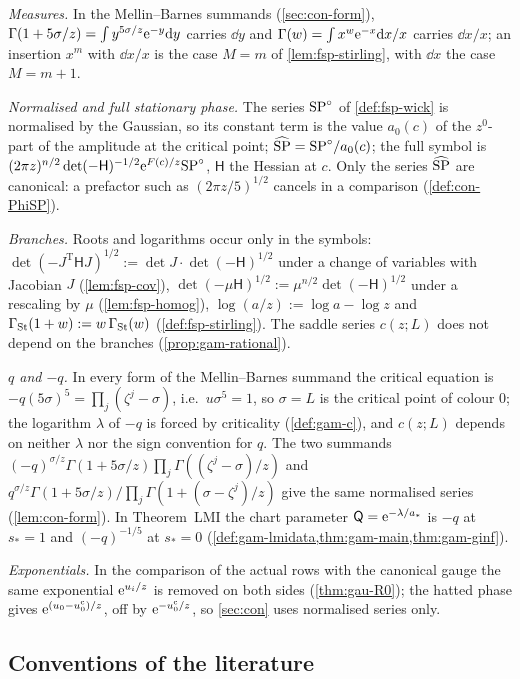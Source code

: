 \emph{Measures.} In the Mellin--Barnes summands (\cref{sec:con-form}), $\Gamma(1+5\sigma/z)=\int y^{5\sigma/z}\mathrm{e}^{-y}\mathrm{d} y$ carries $\dd y$ and $\Gamma(w)=\int x^w\mathrm{e}^{-x}\mathrm{d} x/x$ carries $\dd x/x$; an insertion $x^m$ with $\dd x/x$ is the case $M=m$ of \cref{lem:fsp-stirling}, with $\dd x$ the case $M=m+1$.

\emph{Normalised and full stationary phase.} The series $\mathrm{SP}^{\circ}$ of \cref{def:fsp-wick} is normalised by the Gaussian, so its constant term is the value $a_0(c)$ of the $z^0$-part of the amplitude at the critical point; $\widehat{\mathrm{SP}}=\mathrm{SP}^{\circ}/a_0(c)$; the full symbol is $(2\pi z)^{n/2}\det(-\mathsf H)^{-1/2}\mathrm{e}^{F(c)/z}\mathrm{SP}^{\circ}$, $\mathsf H$ the Hessian at $c$. Only the series $\widehat{\mathrm{SP}}$ are canonical: a prefactor such as $(2\pi z/5)^{1/2}$ cancels in a comparison (\cref{def:con-PhiSP}).

\emph{Branches.} Roots and logarithms occur only in the symbols: $\det(-J^{\mathrm T}\mathsf HJ)^{1/2}:=\det J\cdot\det(-\mathsf H)^{1/2}$ under a change of variables with Jacobian $J$ (\cref{lem:fsp-cov}), $\det(-\mu\mathsf H)^{1/2}:=\mu^{n/2}\det(-\mathsf H)^{1/2}$ under a rescaling by $\mu$ (\cref{lem:fsp-homog}), $\log(a/z):=\log a-\log z$ and $\Gamma_{\mathrm{St}}(1+w):=w\,\Gamma_{\mathrm{St}}(w)$ (\cref{def:fsp-stirling}). The saddle series $c(z;L)$ does not depend on the branches (\cref{prop:gam-rational}).

\emph{$q$ and $-q$.} In every form of the Mellin--Barnes summand the critical equation is $-q(5\sigma)^5=\prod_j(\zeta^j-\sigma)$, i.e.\ $u\sigma^5=1$, so $\sigma=L$ is the critical point of colour $0$; the logarithm $\lambda$ of $-q$ is forced by criticality (\cref{def:gam-c}), and $c(z;L)$ depends on neither $\lambda$ nor the sign convention for $q$. The two summands $(-q)^{\sigma/z}\Gamma(1+5\sigma/z)\prod_j\Gamma((\zeta^j-\sigma)/z)$ and $q^{\sigma/z}\Gamma(1+5\sigma/z)/\prod_j\Gamma(1+(\sigma-\zeta^j)/z)$ give the same normalised series (\cref{lem:con-form}). In Theorem~LMI the chart parameter $\mathsf Q=\mathrm{e}^{-\lambda/a_*}$ is $-q$ at $s_*=1$ and $(-q)^{-1/5}$ at $s_*=0$ (\cref{def:gam-lmidata,thm:gam-main,thm:gam-ginf}).

\emph{Exponentials.} In the comparison of the actual rows with the canonical gauge the same exponential $\mathrm{e}^{u_i/z}$ is removed on both sides (\cref{thm:gau-R0}); the hatted phase gives $\mathrm{e}^{(u_0-u_0^{\mathrm c})/z}$, off by $\mathrm{e}^{-u_0^{\mathrm c}/z}$, so \cref{sec:con} uses normalised series only.

\subsection{Conventions of the literature}
\label{sec:sgn-lit}

